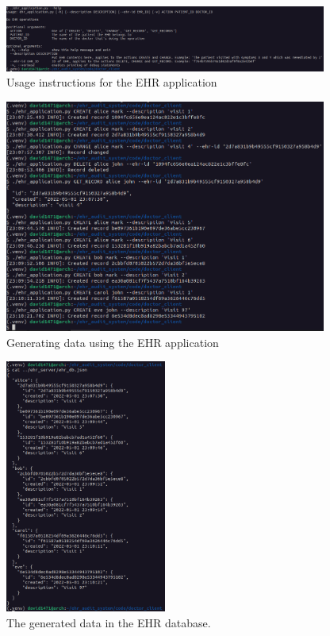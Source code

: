 \documentclass[11pt]{article}
\begin{document}
\begin{flushleft}
\begin{figure}[h!]
	\begin{center}
		\includegraphics[width = 400px]{images/ehr_application_help.png}
		\caption{Usage instructions for the EHR application}
	\end{center}
\end{figure}

\begin{figure}[h!]
\begin{center}
	\includegraphics[width = 400px]{images/generating_data.png}
	\caption{Generating data using the EHR application}
\end{center}
\end{figure}

\newpage

\begin{figure}[h!]
\begin{center}
	\includegraphics[width = 200px]{images/ehr_db_generated.png}
	\caption{The generated data in the EHR database.}
\end{center}
\end{figure}


\end{flushleft}
\end{document}
